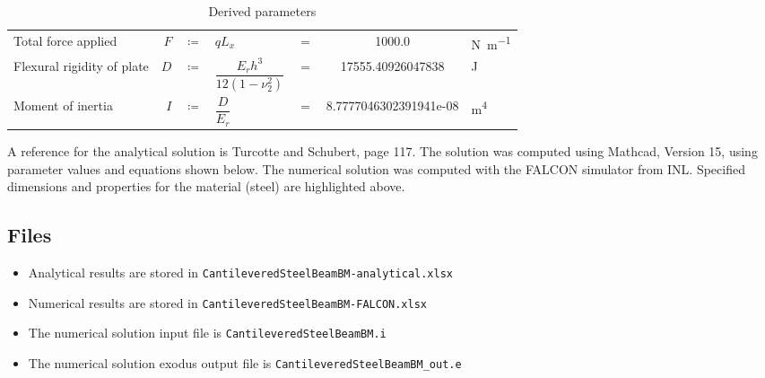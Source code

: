 \begin{table}[h]
	\caption{Derived parameters}
	\begin{center}
		\begin{tabular}{lrclcSs}
		Total force applied& $F$ & $\coloneqq$ & $qL_x$ & $=$ &1000.0 & \si{\newton\per\metre} \\
		Flexural rigidity of plate& $D$ & $\coloneqq$ & $\dfrac{E_r h^3}{12(1-\nu_2^2)}$ & $=$ &  17555.40926047838& \si{\joule} \\

		Moment of inertia & $I$ & $\coloneqq$ & $\dfrac{D}{E_r}$ & $=$ &  8.7777046302391941e-08 & \si{\metre\tothe{4}} 
	\end{tabular}
	\end{center}
	\label{tab:beamDerivPar}
\end{table}
A reference for the analytical solution is Turcotte and Schubert, page 117. The solution was computed using Mathcad, Version 15, using parameter values and equations shown below. The numerical solution was computed with the FALCON simulator from INL. Specified dimensions and properties for the material (steel) are highlighted above.

\subsection{Files}
\begin{itemize}
	\item Analytical results are stored in \verb|CantileveredSteelBeamBM-analytical.xlsx|
	\item Numerical results are stored in \verb|CantileveredSteelBeamBM-FALCON.xlsx|
	\item The numerical solution input file is \verb|CantileveredSteelBeamBM.i|
	\item The numerical solution exodus output file is \verb|CantileveredSteelBeamBM_out.e|
\end{itemize}

